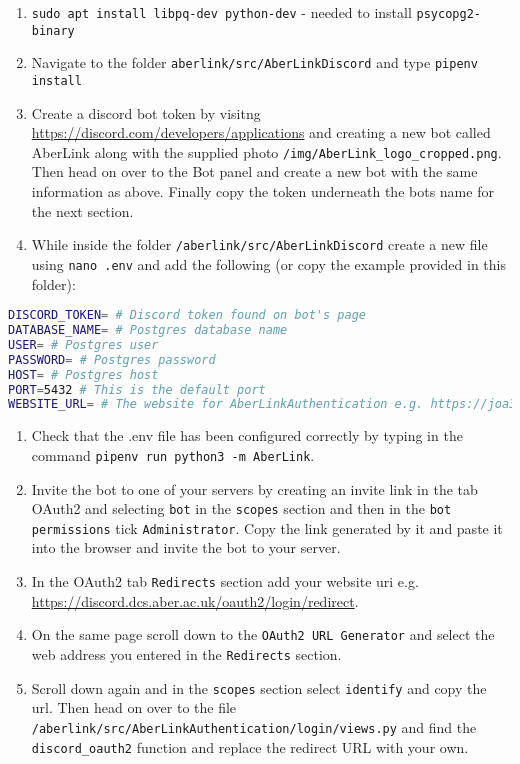 \begin{enumerate}
\def\labelenumi{\arabic{enumi}.}
\item
  \texttt{sudo apt install libpq-dev python-dev} - needed to install
  \texttt{psycopg2-binary}
\item
  Navigate to the folder \texttt{aberlink/src/AberLinkDiscord} and type
  \texttt{pipenv install}
\item
  Create a discord bot token by visitng
  \url{https://discord.com/developers/applications} and creating a new
  bot called AberLink along with the supplied photo
  \texttt{/img/AberLink\_logo\_cropped.png}. Then head on over to the
  Bot panel and create a new bot with the same information as above.
  Finally copy the token underneath the bots name for the next section.
\item
  While inside the folder \texttt{/aberlink/src/AberLinkDiscord} create
  a new file using \texttt{nano .env} and add the following (or copy the
  example provided in this folder):
\end{enumerate}

\begin{lstlisting}[language=bash]
DISCORD_TOKEN= # Discord token found on bot's page
DATABASE_NAME= # Postgres database name
USER= # Postgres user
PASSWORD= # Postgres password
HOST= # Postgres host
PORT=5432 # This is the default port
WEBSITE_URL= # The website for AberLinkAuthentication e.g. https://joa38-mmp.dcs.aber.ac.uk/ 
\end{lstlisting}

\begin{enumerate}
\def\labelenumi{\arabic{enumi}.}
\setcounter{enumi}{4}
\item
  Check that the .env file has been configured correctly by typing in
  the command \texttt{pipenv run python3 -m AberLink}.
\item
  Invite the bot to one of your servers by creating an invite link in
  the tab OAuth2 and selecting \texttt{bot} in the \texttt{scopes}
  section and then in the \texttt{bot permissions} tick
  \texttt{Administrator}. Copy the link generated by it and paste it
  into the browser and invite the bot to your server.
\item
  In the OAuth2 tab \texttt{Redirects} section add your website uri e.g.
  \url{https://discord.dcs.aber.ac.uk/oauth2/login/redirect}.
\item
  On the same page scroll down to the \texttt{OAuth2 URL Generator} and
  select the web address you entered in the \texttt{Redirects} section.
\item
  Scroll down again and in the \texttt{scopes} section select
  \texttt{identify} and copy the url. Then head on over to the file
  \texttt{/aberlink/src/AberLinkAuthentication/login/views.py} and find
  the \texttt{discord\_oauth2} function and replace the redirect URL
  with your own.
\end{enumerate}

